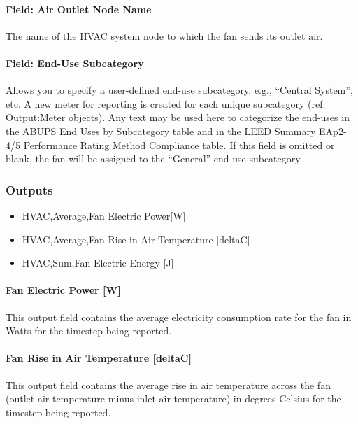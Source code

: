 \paragraph{Field: Air Outlet Node Name}\label{field-air-outlet-node-name-002}

The name of the HVAC system node to which the fan sends its outlet air.

\paragraph{Field: End-Use Subcategory}\label{field-end-use-subcategory-001}

Allows you to specify a user-defined end-use subcategory, e.g., ``Central System'', etc. A new meter for reporting is created for each unique subcategory (ref: Output:Meter objects). Any text may be used here to categorize the end-uses in the ABUPS End Uses by Subcategory table and in the LEED Summary EAp2-4/5 Performance Rating Method Compliance table. If this field is omitted or blank, the fan will be assigned to the ``General'' end-use subcategory.

\subsubsection{Outputs}\label{outputs-013}

\begin{itemize}
\item
  HVAC,Average,Fan Electric Power{[}W{]}
\item
  HVAC,Average,Fan Rise in Air Temperature {[}deltaC{]}
\item
  HVAC,Sum,Fan Electric Energy {[}J{]}
\end{itemize}

\paragraph{Fan Electric Power {[}W{]}}\label{fan-electric-power-w}

This output field contains the average electricity consumption rate for the fan in Watts for the timestep being reported.

\paragraph{Fan Rise in Air Temperature {[}deltaC{]}}\label{fan-rise-in-air-temperature-deltac}

This output field contains the average rise in air temperature across the fan (outlet air temperature minus inlet air temperature) in degrees Celsius for the timestep being reported.

